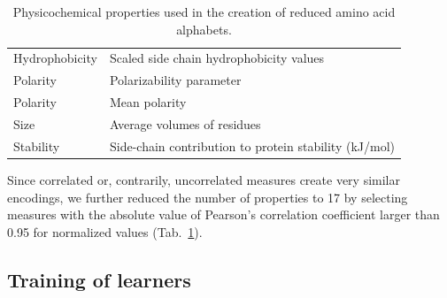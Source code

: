 \documentclass{bioinfo}
\begin{document}
\begin{methods}
\begin{table}[bth]
\begin{tabularx}{\columnwidth}{@{} lX @{}}
  Hydrophobicity & Scaled side chain hydrophobicity values \newline \citep{black_development_1991} \\ 
  Polarity & Polarizability parameter \newline \citep{charton_structural_1982} \\ 
  Polarity & Mean polarity \newline \citep{radzicka_comparing_1988} \\ 
  Size & Average volumes of residues \newline \citep{pontius_deviations_1996} \\ 
  Stability & Side-chain contribution to protein stability (kJ/mol) \newline \citep{takano_new_2001} \\
  \bottomrule
\end{tabularx}
\caption{Physicochemical properties used in the creation of reduced amino acid 
alphabets.} 
\label{tab:properties}
\end{table}

  Since correlated or, contrarily, uncorrelated measures create very similar 
%
%
%
encodings, we further reduced the number of properties to 17 by selecting 
%
%
%
measures with the absolute value of Pearson's correlation coefficient larger 
than 0.95 for normalized values (Tab.~\ref{tab:properties}).

\subsection{Training of learners}


\end{methods}
\end{document}
